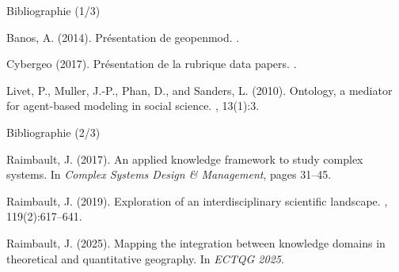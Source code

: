 \documentclass[english,10pt]{beamer}
\begin{document}
\begin{frame}{Bibliographie (1/3)}

\footnotesize

\begin{thebibliography}{}

Banos, A. (2014).
\newblock Présentation de geopenmod.
.

Cybergeo (2017).
\newblock Présentation de la rubrique data papers.
.

Livet, P., Muller, J.-P., Phan, D., and Sanders, L. (2010).
\newblock Ontology, a mediator for agent-based modeling in social science.
, 13(1):3.


\end{thebibliography}

\end{frame}

\begin{frame}{Bibliographie (2/3)}

\footnotesize

\begin{thebibliography}{}
Raimbault, J. (2017).
\newblock An applied knowledge framework to study complex systems.
\newblock In {\em Complex Systems Design \& Management}, pages 31--45.

Raimbault, J. (2019).
\newblock Exploration of an interdisciplinary scientific landscape.
, 119(2):617--641.

Raimbault, J. (2025).
\newblock Mapping the integration between knowledge domains in theoretical and
  quantitative geography.
\newblock In {\em ECTQG 2025}.


\end{thebibliography}

\end{frame}
\end{document}
